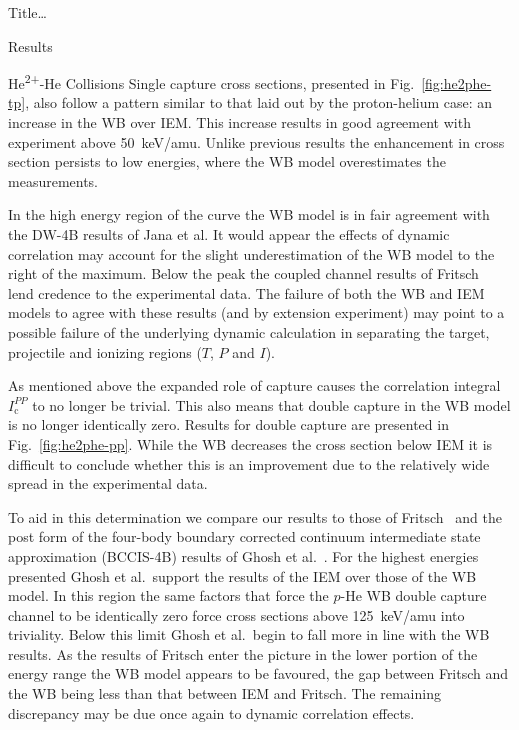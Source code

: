 \documentclass[letterpaper, 11 pt]{report}
\begin{document}
\begin{chapter}{ Title\dots \label{chap:p-he2p-he}}
\begin{section}{Results \label{sec:phe2p-res}}
\begin{subsection}{\texorpdfstring{He\textsuperscript{2+}}{He2+}-He Collisions 
                         \label{sec:he2phe-res}}
         Single capture cross sections, presented in Fig.~\ref{fig:he2phe-tp}, also follow a pattern
         similar to that laid out by the proton-helium case: an increase in the WB over IEM. This
         increase results in good agreement with experiment above 50~keV/amu. Unlike previous results
         the enhancement in cross section persists to low energies, where the WB model overestimates the
          measurements.

         In the high energy region of the curve the WB model is in fair agreement with the DW-4B results
         of Jana et al. It would appear the effects of dynamic correlation may account for the
         slight underestimation of the WB model to the right of the maximum. Below the peak the coupled
         channel results of Fritsch~\cite{Fritsch-94} lend credence to the experimental data. The
         failure of both the WB and IEM models to agree with these results (and by extension experiment)
         may point to a possible failure of the underlying dynamic calculation in separating the target,
         projectile and ionizing regions ($T$, $P$ and $I$).

         As mentioned above the expanded role of capture causes the correlation integral
         $I^{PP}_\mathrm{c}$ to no longer be trivial. This also means that double capture in the WB
         model is no longer identically zero. Results for double capture are presented in
         Fig.~\ref{fig:he2phe-pp}. While the WB decreases the cross section below IEM it is difficult to
         conclude whether this is an improvement due to the relatively wide spread in the experimental
         data.

         To aid in this determination we compare our results to those of Fritsch~\cite{Fritsch-94} and
         the post form of the four-body boundary corrected continuum intermediate state approximation
         (BCCIS-4B) results of Ghosh et al.~\cite{GDMP-08}. For the highest energies presented
         Ghosh et al.\ support the results of the IEM over those of the WB model. In this
         region the same factors that force the $p$-He WB double capture channel to be identically zero
         force cross sections above 125~keV/amu into triviality. Below this limit Ghosh
         et al.\ begin to fall more in line with the WB results. As the results of Fritsch
         enter the picture in the lower portion of the energy range the WB model appears to be favoured,
         the gap between Fritsch and the WB being less than that between IEM and Fritsch. The remaining
         discrepancy may be due once again to dynamic correlation effects.

      \end{subsection}

   \end{section}

\end{chapter}
\end{document}
